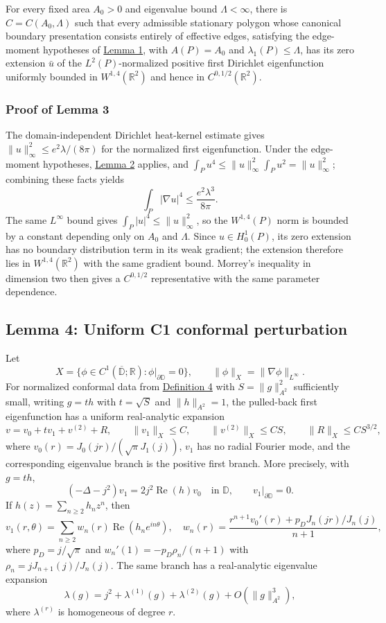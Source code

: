\documentclass[11pt]{article}
\begin{document}
For every fixed area \(A_0>0\) and eigenvalue bound \(\Lambda<\infty\),
there is \(C=C(A_0,\Lambda)\) such that every admissible stationary
polygon whose canonical boundary presentation consists entirely of
effective edges, satisfying the edge-moment hypotheses of
\hyperref[lem-edge-moments]{Lemma 1}, with \(A(P)=A_0\) and
\(\lambda_1(P)\le\Lambda\), has its zero extension \(\bar u\) of the
\(L^2(P)\)-normalized positive first Dirichlet eigenfunction uniformly
bounded in \(W^{1,4}(\mathbb R^2)\) and hence in
\(C^{0,1/2}(\mathbb R^2)\).

\subsubsection{Proof of Lemma 3}\label{proof-lem-uniform-w14}

The domain-independent Dirichlet heat-kernel estimate gives
\(\|u\|_\infty^2\le e^2\lambda/(8\pi)\) for the normalized first
eigenfunction. Under the edge-moment hypotheses,
\hyperref[lem-airy-identity]{Lemma 2} applies, and
\(\int_Pu^4\le\|u\|_\infty^2\int_Pu^2=\|u\|_\infty^2\); combining these
facts yields \[
\int_P|\nabla u|^4\le \frac{e^2\lambda^3}{8\pi}.
\] The same \(L^\infty\) bound gives \(\int_P|u|^4\le\|u\|_\infty^2\),
so the \(W^{1,4}(P)\) norm is bounded by a constant depending only on
\(A_0\) and \(\Lambda\). Since \(u\in H^1_0(P)\), its zero extension has
no boundary distribution term in its weak gradient; the extension
therefore lies in \(W^{1,4}(\mathbb R^2)\) with the same gradient bound.
Morrey's inequality in dimension two then gives a \(C^{0,1/2}\)
representative with the same parameter dependence.

\subsection{Lemma 4: Uniform C1 conformal
perturbation}\label{lem-c1-perturbation}

Let \[
X=\{\phi\in C^1(\overline{\mathbb D};\mathbb R):\phi|_{\partial\mathbb D}=0\},
\qquad \|\phi\|_X=\|\nabla\phi\|_{L^\infty}.
\] For normalized conformal data from
\hyperref[def-conformal-data]{Definition 4} with \(S=\|g\|_{A^2}^2\)
sufficiently small, writing \(g=t h\) with \(t=\sqrt S\) and
\(\|h\|_{A^2}=1\), the pulled-back first eigenfunction has a uniform
real-analytic expansion \[
v=v_0+t v_1+v^{(2)}+R,
\qquad \|v_1\|_X\le C,
\qquad \|v^{(2)}\|_X\le CS,
\qquad \|R\|_X\le CS^{3/2},
\] where \(v_0(r)=J_0(jr)/(\sqrt\pi J_1(j))\), \(v_1\) has no radial
Fourier mode, and the corresponding eigenvalue branch is the positive
first branch. More precisely, with \(g=th\), \[
(-\Delta-j^2)v_1=2j^2\operatorname{Re}(h)v_0\quad\text{in }\mathbb D,
\qquad v_1|_{\partial\mathbb D}=0.
\] If \(h(z)=\sum_{n\ge2}h_nz^n\), then \[
v_1(r,\theta)=\sum_{n\ge2}w_n(r)\operatorname{Re}(h_ne^{in\theta}),
\quad
w_n(r)=\frac{r^{n+1}v_0'(r)+p_DJ_n(jr)/J_n(j)}{n+1},
\] where \(p_D=j/\sqrt\pi\) and \(w_n'(1)=-p_D\rho_n/(n+1)\) with
\(\rho_n=jJ_{n+1}(j)/J_n(j)\). The same branch has a real-analytic
eigenvalue expansion \[
\lambda(g)=j^2+\lambda^{(1)}(g)+\lambda^{(2)}(g)+O(\|g\|_{A^2}^3),
\] where \(\lambda^{(r)}\) is homogeneous of degree \(r\).
\end{document}
